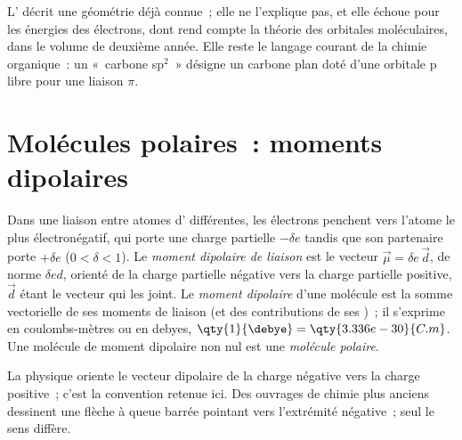 \begin{remark}\label{rem:b1:lewis-resonance-vsepr:hybrid-limit}
L' décrit une géométrie déjà connue~; elle ne l'explique pas,
et elle échoue pour les énergies des électrons, dont rend compte la
théorie des orbitales moléculaires, dans le volume de deuxième année.
Elle reste le langage courant de la chimie organique~: un «~carbone
sp$^2$~» désigne un carbone plan doté d'une orbitale p libre pour une
liaison $\pi$.
\end{remark}

\section{Molécules polaires~: moments dipolaires}

\begin{definition}\label{def:b1:lewis-resonance-vsepr:dipole}
Dans une liaison entre atomes d' différentes, les
électrons penchent vers l'atome le plus électronégatif, qui porte une
charge partielle $-\delta e$ tandis que son partenaire porte $+\delta e$
($0 < \delta < 1$). Le \emph{moment dipolaire de liaison} est le
vecteur $\vec\mu = \delta e\,
\vec d$, de norme $\delta e d$, orienté de la charge partielle négative
vers la charge partielle positive, $\vec d$ étant le vecteur qui les
joint. Le \emph{moment dipolaire} d'une molécule est la somme
vectorielle de ses moments de liaison (et des contributions de ses
)~; il s'exprime en coulombs-mètres ou en debyes,
$\qty{1}{\debye} =
\qty{3.336e-30}{C.m}$. Une molécule de moment dipolaire non nul est une
\emph{molécule polaire}.
\end{definition}

\begin{remark}\label{rem:b1:lewis-resonance-vsepr:convention}
La physique oriente le vecteur dipolaire de la charge négative vers la
charge positive~; c'est la convention retenue ici. Des ouvrages de
chimie plus anciens dessinent une flèche à queue barrée pointant vers
l'extrémité négative~; seul le sens diffère.
\end{remark}

